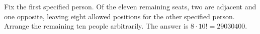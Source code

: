 Fix the first specified person. Of the eleven remaining seats, two are adjacent and one opposite, leaving eight allowed positions for the other specified person. Arrange the remaining ten people arbitrarily. The answer is $\boxed{8\cdot10!=29030400}$.
